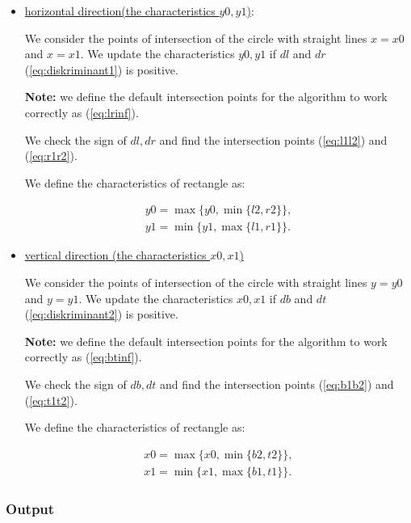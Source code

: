 \documentclass{report}
\begin{document}
\begin{itemize}
	
	\item \underline {horizontal direction(the characteristics $y0, y1$)}:
	
	We consider the points of intersection of the circle with straight lines $x = x0$ and $x = x1$. We update the characteristics $y0, y1$ if $dl$ and $dr$ (\ref{eq:diskriminant1}) is positive.
	
	{\bfseries Note:} we define the default intersection points for the algorithm to work correctly as (\ref{eq:lrinf}).
	
	We check the sign of $dl, dr$ and find the intersection points (\ref{eq:l1l2}) and (\ref{eq:r1r2}).
	
	We define the characteristics of rectangle as:
	
	\begin{equation}
		\begin{gathered}
			y0 = \max\{y0, \min\{l2, r2\}\},\\
			y1 = \min\{y1, \max\{l1, r1\}\}.
		\end{gathered}
	\end{equation}
	
	\item \underline {vertical direction (the characteristics $x0, x1$) }
	
	We consider the points of intersection of the circle with straight lines $y = y0$ and $y = y1$.  We update the characteristics $x0, x1$ if $db$ and  $dt$ (\ref{eq:diskriminant2}) is positive.
	
	{\bfseries Note:} we define the default intersection points for the algorithm to work correctly as (\ref{eq:btinf}).
	
	We check the sign of $db, dt$ and find the intersection points (\ref{eq:b1b2}) and (\ref{eq:t1t2}).
	
	We define the characteristics of rectangle as:
	
	\begin{equation}
		\begin{gathered}
			x0 = \max\{x0, \min\{b2, t2\}\},\\
			x1 = \min\{x1, \max\{b1, t1\}\}.
		\end{gathered}
	\end{equation}
	
\end{itemize}	


\subsubsection*{Output}
\end{document}
